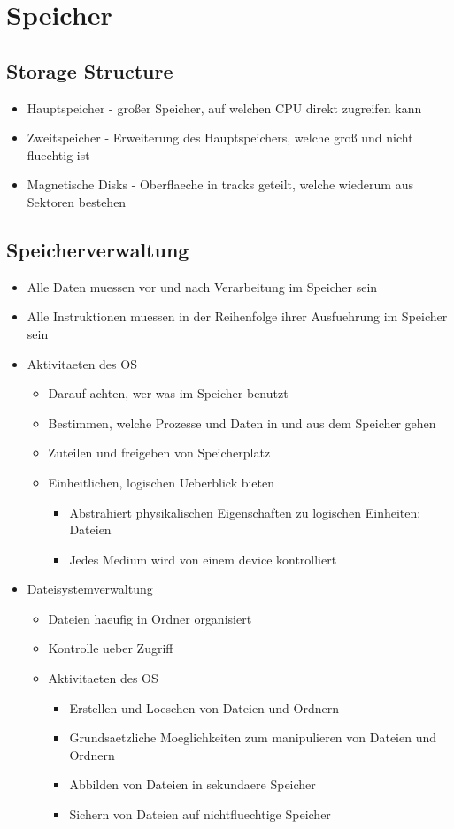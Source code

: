 \documentclass[a4paper]{scrreprt}
\begin{document}
\section{Speicher}
\subsection{Storage Structure}
\begin{itemize}
	\item Hauptspeicher - großer Speicher, auf welchen CPU direkt zugreifen kann
	\item Zweitspeicher - Erweiterung des Hauptspeichers, welche groß und nicht fluechtig ist
	\item Magnetische Disks - Oberflaeche in tracks geteilt, welche wiederum aus Sektoren bestehen
\end{itemize}

\subsection{Speicherverwaltung}
\begin{itemize}
	\item Alle Daten muessen vor und nach Verarbeitung im Speicher sein
	\item Alle Instruktionen muessen in der Reihenfolge ihrer Ausfuehrung im Speicher sein
	\item Aktivitaeten des OS
		\begin{itemize}
			\item Darauf achten, wer was im Speicher benutzt
			\item Bestimmen, welche Prozesse und Daten in und aus dem Speicher gehen
			\item Zuteilen und freigeben von Speicherplatz
			\item Einheitlichen, logischen Ueberblick bieten
				\begin{itemize}
					\item Abstrahiert physikalischen Eigenschaften zu logischen Einheiten: Dateien
					\item Jedes Medium wird von einem device kontrolliert
				\end{itemize}
		\end{itemize}
	\item Dateisystemverwaltung
		\begin{itemize}
			\item Dateien haeufig in Ordner organisiert
			\item Kontrolle ueber Zugriff
			\item Aktivitaeten des OS
				\begin{itemize}
					\item Erstellen und Loeschen von Dateien und Ordnern
					\item Grundsaetzliche Moeglichkeiten zum manipulieren von Dateien und Ordnern
					\item Abbilden von Dateien in sekundaere Speicher
					\item Sichern von Dateien auf nichtfluechtige Speicher
				\end{itemize}
		\end{itemize}
\end{itemize}
\end{document}
